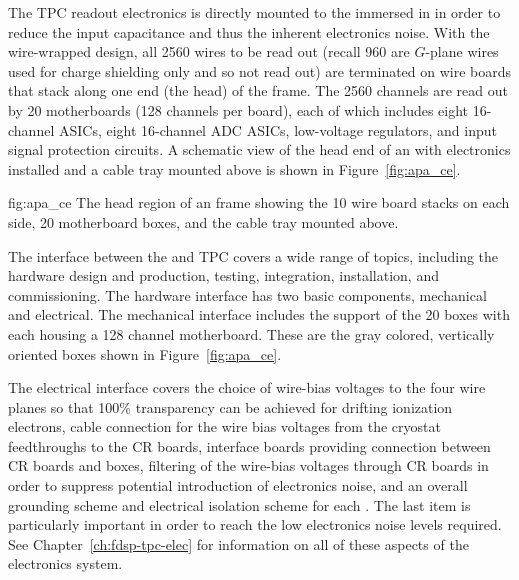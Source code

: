 The TPC readout electronics is directly mounted to the  immersed in \lar in order to reduce the input capacitance and thus the inherent electronics noise.  With the wire-wrapped design, all \num{2560} wires to be read out (recall \num{960} are $G$-plane wires used for charge shielding only and so not read out) are terminated on wire boards that stack along one end (the head) of the  frame.  The \num{2560} channels are read out by \num{20}  motherboards (\num{128} channels per board), each of which includes eight \num{16}-channel  ASICs, eight \num{16}-channel ADC ASICs, low-voltage regulators, and input signal protection circuits.  A schematic view of the head end of an  with electronics installed and a cable tray mounted above is shown in Figure~\ref{fig:apa_ce}. 

\begin{dunefigure}{fig:apa_ce}
{The head region of an  frame showing the 10 wire board stacks on each side, \num{20}  motherboard boxes, and the cable tray mounted above.}
\end{dunefigure}

The interface between the  and TPC  covers a wide range of topics, including the hardware design and production, testing, integration, installation, and commissioning. The hardware interface has two basic components, mechanical and electrical. The mechanical interface includes the support of the \num{20}  boxes with each housing a \num{128} channel  motherboard.  These are the gray colored, vertically oriented boxes shown in Figure~\ref{fig:apa_ce}. 

The electrical interface covers the choice of wire-bias voltages to the four wire planes so that \num{100}\% transparency can be achieved for drifting ionization electrons, cable connection for the wire bias voltages from the cryostat feedthroughs to the CR boards, interface boards providing connection between CR boards and  boxes, filtering of the wire-bias voltages through CR boards in order to suppress potential introduction of electronics noise, and an overall grounding scheme and electrical isolation scheme for each . The last item is particularly important in order to reach the low electronics noise levels required.  See Chapter~\ref{ch:fdsp-tpc-elec} for information on all of these aspects of the  electronics system.


